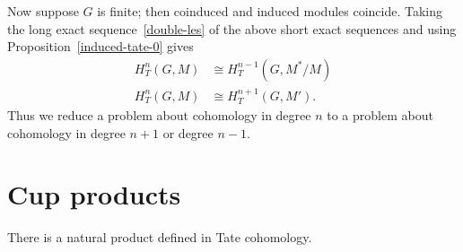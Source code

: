 Now suppose $G$ is finite; then coinduced and induced modules coincide. Taking the long exact sequence~\ref{double-les} of the above short exact sequences and using Proposition~\ref{induced-tate-0} gives
\begin{align*}
H_T^n(G,M)&\cong H_T^{n-1}(G,M^*/M)\\
H_T^n(G,M)&\cong H_T^{n+1}(G,M').
\end{align*}
Thus we reduce a problem about cohomology in degree $n$ to a problem about cohomology in degree $n+1$ or degree $n-1$.
\section{Cup products}
There is a natural product defined in Tate cohomology.

